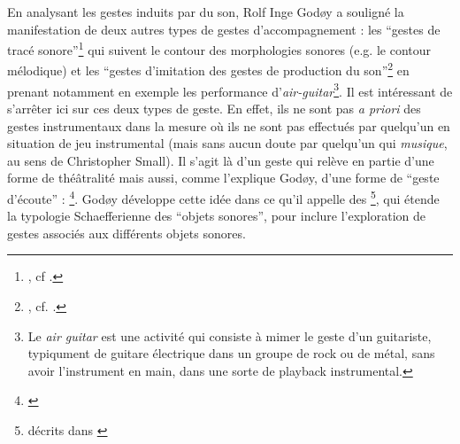 \indent En analysant les gestes induits par du son, Rolf Inge Godøy a souligné la manifestation de deux autres types de gestes d'accompagnement : les ``gestes de tracé sonore''\footnote{, cf \cite{godoy_exploring_2006}.} qui suivent le contour des morphologies sonores (e.g. le contour mélodique) et les ``gestes d'imitation des gestes de production du son''\footnote{, cf. \cite{godoy_playing_2005}.} en prenant notamment en exemple les performance d'\textit{air-guitar}\footnote{Le \textit{air guitar} est une activité qui consiste à mimer le geste d’un guitariste, typiqument de guitare électrique dans un groupe de rock ou de métal, sans avoir l’instrument en main, dans une sorte de playback instrumental.}. Il est intéressant de s'arrêter ici sur ces deux types de geste. En effet, ils ne sont pas \textit{a priori} des gestes instrumentaux dans la mesure où ils ne sont pas effectués par quelqu'un en situation de jeu instrumental (mais sans aucun doute par quelqu'un qui \textit{musique}, au sens de Christopher Small). Il s'agit là d'un geste qui relève en partie d'une forme de théâtralité mais aussi, comme l'explique Godøy, d'une forme de ``geste d'écoute'' :  \footnote{ \cite{godoy_exploring_2006}}. Godøy développe cette idée dans ce qu'il appelle des \footnote{ décrits dans \cite{godoy_gestural-sonorous_2006}}, qui étende la typologie Schaefferienne des ``objets sonores''\cite{schaeffer_traite_1966}, pour inclure l'exploration de gestes associés aux différents objets sonores.\\
